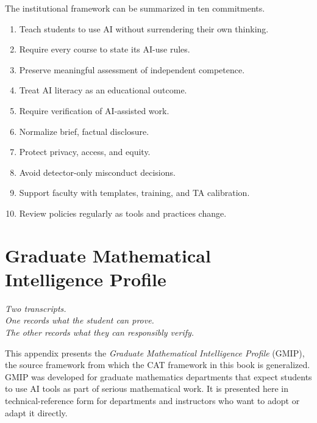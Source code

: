 \documentclass{SIAMbook2023}
\newcommand{\bookepigraph}[1]{%
  \begin{center}%
    \begin{minipage}{0.78\textwidth}%
      \centering\itshape #1%
    \end{minipage}%
  \end{center}%
  \vspace{0.6em}%
}
\begin{document}
The institutional framework can be summarized in ten commitments.

\begin{enumerate}
  \item Teach students to use AI without surrendering their own thinking.
  \item Require every course to state its AI-use rules.
  \item Preserve meaningful assessment of independent competence.
  \item Treat AI literacy as an educational outcome.
  \item Require verification of AI-assisted work.
  \item Normalize brief, factual disclosure.
  \item Protect privacy, access, and equity.
  \item Avoid detector-only misconduct decisions.
  \item Support faculty with templates, training, and TA calibration.
  \item Review policies regularly as tools and practices change.
\end{enumerate}


\appendix


\chapter{Graduate Mathematical Intelligence Profile}
\label{app:ch:graduate-mathematical-intelligence-profile}%
\label{app:gmip}

\bookepigraph{Two transcripts.\\One records what the student can prove.\\The other records what they can responsibly verify.}

This appendix presents the \emph{Graduate Mathematical Intelligence Profile} (GMIP), the source framework from which the CAT framework in this book is generalized. GMIP was developed for graduate mathematics departments that expect students to use AI tools as part of serious mathematical work. It is presented here in technical-reference form for departments and instructors who want to adopt or adapt it directly.
\end{document}
